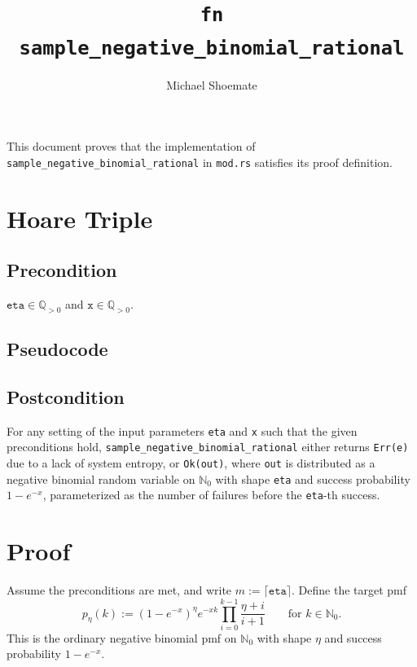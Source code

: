 \documentclass{article}
\title{\texttt{fn sample\_negative\_binomial\_rational}}
\author{Michael Shoemate}
\begin{document}
\maketitle

This document proves that the implementation of \texttt{sample\_negative\_binomial\_rational}
in \texttt{mod.rs} satisfies its proof definition.

\section{Hoare Triple}
\subsection*{Precondition}
$\texttt{eta} \in \mathbb{Q}_{>0}$ and $\texttt{x} \in \mathbb{Q}_{>0}$.

\subsection*{Pseudocode}


\subsection*{Postcondition}
\label{postcondition}
For any setting of the input parameters \texttt{eta} and \texttt{x} such that the given preconditions hold,
\texttt{sample\_negative\_binomial\_rational} either returns \texttt{Err(e)} due to a lack of system entropy,
or \texttt{Ok(out)}, where \texttt{out} is distributed as a negative binomial random variable on $\mathbb{N}_0$
with shape \texttt{eta} and success probability $1 - e^{-x}$, parameterized as the number of failures before
the \texttt{eta}-th success.

\section{Proof}
Assume the preconditions are met, and write $m := \lceil \texttt{eta} \rceil$.
Define the target pmf
\begin{equation*}
p_\eta(k) := (1 - e^{-x})^{\eta} e^{-xk} \prod_{i=0}^{k-1}\frac{\eta + i}{i + 1}
\qquad\text{for } k \in \mathbb{N}_0.
\end{equation*}
This is the ordinary negative binomial pmf on $\mathbb{N}_0$ with shape $\eta$
and success probability $1 - e^{-x}$.
\end{document}
